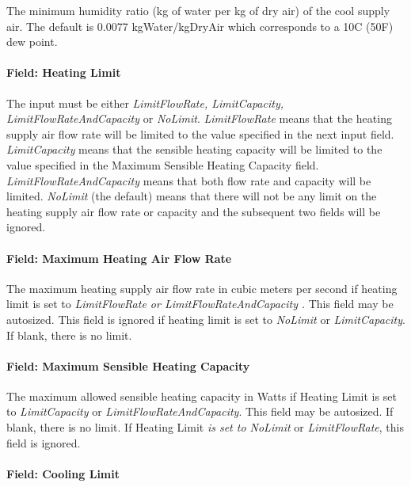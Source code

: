 The minimum humidity ratio (kg of water per kg of dry air) of the cool supply air. The default is 0.0077 kgWater/kgDryAir which corresponds to a 10C (50F) dew point.

\paragraph{Field: Heating Limit}\label{field-heating-limit}

The input must be either \emph{LimitFlowRate, LimitCapacity, LimitFlowRateAndCapacity} or \emph{NoLimit}. \emph{LimitFlowRate} means that the heating supply air flow rate will be limited to the value specified in the next input field. \emph{LimitCapacity} means that the sensible heating capacity will be limited to the value specified in the Maximum Sensible Heating Capacity field. \emph{LimitFlowRateAndCapacity} means that both flow rate and capacity will be limited. \emph{NoLimit} (the default) means that there will not be any limit on the heating supply air flow rate or capacity and the subsequent two fields will be ignored.

\paragraph{Field: Maximum Heating Air Flow Rate}\label{field-maximum-heating-air-flow-rate-000}

The maximum heating supply air flow rate in cubic meters per second if heating limit is set to \emph{LimitFlowRate or LimitFlowRateAndCapacity} \emph{.} This field may be autosized. This field is ignored if heating limit is set to \emph{NoLimit} or \emph{LimitCapacity}. If blank, there is no limit.

\paragraph{Field: Maximum Sensible Heating Capacity}\label{field-maximum-sensible-heating-capacity}

The maximum allowed sensible heating capacity in Watts if Heating Limit is set to \emph{LimitCapacity} or \emph{LimitFlowRateAndCapacity}. This field may be autosized. If blank, there is no limit. If Heating Limit \emph{is set to NoLimit} or \emph{LimitFlowRate}, this field is ignored.

\paragraph{Field: Cooling Limit}\label{field-cooling-limit}


